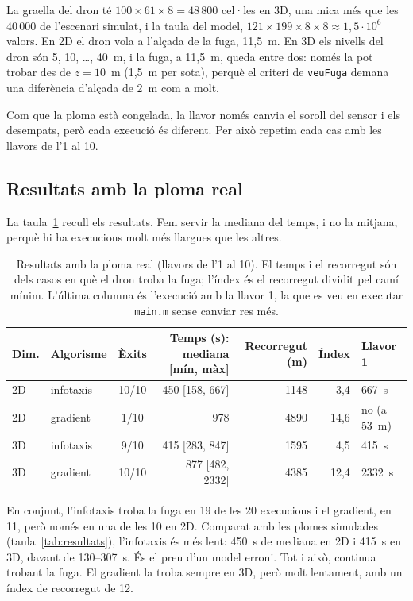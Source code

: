 \documentclass[11pt,a4paper]{article}
\begin{document}
La graella del dron té $100 \times 61 \times 8 = 48\,800$ cel·les en 3D, una mica més que les 40\,000 de l'escenari simulat, i la taula del model, $121 \times 199 \times 8 \times 8 \approx 1{,}5 \cdot 10^6$ valors. En 2D el dron vola a l'alçada de la fuga, 11,5~m. En 3D els nivells del dron són 5, 10, \ldots, 40~m, i la fuga, a 11,5~m, queda entre dos: només la pot trobar des de $z = 10$~m (1,5~m per sota), perquè el criteri de \texttt{veuFuga} demana una diferència d'alçada de 2~m com a molt.

Com que la ploma està congelada, la llavor només canvia el soroll del sensor i els desempats, però cada execució és diferent. Per això repetim cada cas amb les llavors de l'1 al 10.

\FloatBarrier
\subsection{Resultats amb la ploma real}
\label{sec:realres}

La taula~\ref{tab:realres} recull els resultats. Fem servir la mediana del temps, i no la mitjana, perquè hi ha execucions molt més llargues que les altres.

\begin{table}[htbp]
\centering
\caption{Resultats amb la ploma real (llavors de l'1 al 10). El temps i el recorregut són dels casos en què el dron troba la fuga; l'índex és el recorregut dividit pel camí mínim. L'última columna és l'execució amb la llavor 1, la que es veu en executar \texttt{main.m} sense canviar res més.}
\label{tab:realres}
\begin{tabular}{@{}llcrrrl@{}}
\toprule
Dim. & Algorisme & Èxits & Temps (s): mediana [mín, màx] & Recorregut (m) & Índex & Llavor 1 \\
\midrule
2D & infotaxis & 10/10 & 450 [158, 667] & 1148 & 3,4 & 667~s \\
2D & gradient & 1/10 & 978 & 4890 & 14,6 & no (a 53~m) \\
\midrule
3D & infotaxis & 9/10 & 415 [283, 847] & 1595 & 4,5 & 415~s \\
3D & gradient & 10/10 & 877 [482, 2332] & 4385 & 12,4 & 2332~s \\
\bottomrule
\end{tabular}
\end{table}

En conjunt, l'infotaxis troba la fuga en 19 de les 20 execucions i el gradient, en 11, però només en una de les 10 en 2D. Comparat amb les plomes simulades (taula~\ref{tab:resultats}), l'infotaxis és més lent: 450~s de mediana en 2D i 415~s en 3D, davant de 130--307~s. És el preu d'un model erroni. Tot i això, continua trobant la fuga. El gradient la troba sempre en 3D, però molt lentament, amb un índex de recorregut de 12.
\end{document}
